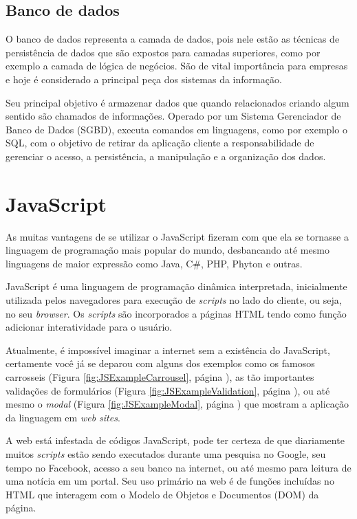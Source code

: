 \documentclass[
	12pt,				%
	openright,			%
	twoside,			%
	a4paper,			%
	english,			%
	brazil				%
	]{abntex2}
\begin{document}
\subsection{Banco de dados}
\label{subsec:BancoDeDados}

O banco de dados representa a camada de dados, pois nele estão as técnicas de persistência de dados que são expostos para camadas superiores, como por exemplo a camada de lógica de negócios. São de vital importância para empresas e hoje é considerado a principal peça dos sistemas da informação.

Seu principal objetivo é armazenar dados que quando relacionados criando algum sentido são chamados de informações. Operado por um Sistema Gerenciador de Banco de Dados (SGBD), executa comandos em linguagens, como por exemplo o SQL, com o objetivo de retirar da aplicação cliente a responsabilidade de gerenciar o acesso, a persistência, a manipulação e a organização dos dados.

\section{JavaScript}

As muitas vantagens de se utilizar o JavaScript fizeram com que ela se tornasse a linguagem de programação mais popular do mundo, desbancando até mesmo linguagens de maior expressão como Java, C\#, PHP, Phyton e outras.

JavaScript é uma linguagem de programação dinâmica interpretada, inicialmente utilizada pelos navegadores para execução de \textit{scripts} no lado do cliente, ou seja, no seu \textit{browser}. Os \textit{scripts} são incorporados a páginas HTML tendo como função adicionar interatividade para o usuário.

Atualmente, é impossível imaginar a internet sem a existência do JavaScript, certamente você já se deparou com alguns dos exemplos como os famosos carrosseis (Figura \ref{fig:JSExampleCarrousel}, página \pageref{fig:JSExampleCarrousel}), as tão importantes validações de formulários (Figura \ref{fig:JSExampleValidation}, página \pageref{fig:JSExampleValidation}), ou até mesmo o \textit{modal} (Figura \ref{fig:JSExampleModal}, página \pageref{fig:JSExampleModal}) que mostram a aplicação da linguagem em \textit{web sites}.

A web está infestada de códigos JavaScript, pode ter certeza de que diariamente muitos \textit{scripts} estão sendo executados durante uma pesquisa no Google, seu tempo no Facebook, acesso a seu banco na internet, ou até mesmo para leitura de uma notícia em um portal. Seu uso primário na web é de funções incluídas no HTML que interagem com o Modelo de Objetos e Documentos (DOM) da página.
\end{document}
